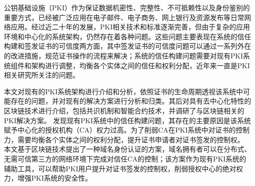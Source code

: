 
\begin{cabstract}





公钥基础设施（PKI）作为保证数据机密性、完整性、不可抵赖性以及身份鉴别的重要方式，已经被广泛应用在电子邮件、电子商务、网上银行及资源发布等日常网络应用。经过近二十年的发展，PKI相关技术和标准逐渐完善，但由于复杂的应用环境和中心化的系统架构，仍然存在着各种问题。这些问题主要表现在系统的信任构建和签发证书的可信度两方面，其中签发证书的可信度问题可以通过一系列外在的改进措施，规范证书操作的流程来解决；系统的信任构建问题需要对现有PKI系统组件和架构进行调整，均衡各个实体之间的信任和权利分配，近年来一直是PKI相关研究所关注的问题。


本文对现有的PKI系统架构进行介绍和分析，依照证书的生命周期透视该系统中可能存在的问题，并对现有的解决方案进行分析和归类。其后对具有去中心化特性的区块链技术进行介绍，包括共识机制和智能合约技术，并调研了与区块链相关的PKI解决方案。
发现现有PKI系统中的信任构建问题，其存在的主要原因是该系统赋予中心化的授权机构（CA）权力过高。为了削弱CA在PKI系统中对证书的控制力，需要均衡各个实体之间的权利分配，提升证书申请者对证书签发的控制权。
本文基于区块链技术提出了一种域名身份认证的方案，域名拥有者可以在分布式、无需可信第三方的网络环境下完成对信任CA的控制；该方案作为现有PKI系统的辅助工具，可以帮助PKI用户提升对证书签发的控制权，削弱授权中心的绝对权力，增强PKI系统的安全性。


\end{cabstract}
